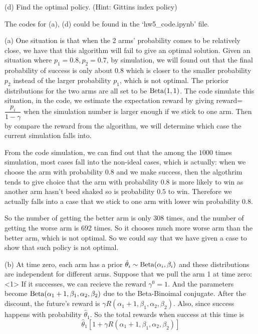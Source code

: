 \begin{homeworkProblem}
(d) Find the optimal policy. (Hint: Gittins index policy)

\solution

The codes for (a), (d) could be found in the `hw5\_code.ipynb' file.

(a) One situation is that when the 2 arms' probability comes to be relatively close, we have that this algorithm will fail to give an optimal solution. Given an situation where $p_1=0.8, p_2=0.7$, by simulation, we will found out that the final probability of success is only about $0.8$ which is closer to the smaller probability $p_2$ instead of the larger probability $p_1$, which is not optimal. The priorior distributions for the two arms are all set to be $\operatorname{Beta}(1,1)$. The code simulate this situation, in the code, we estimate the expectation reward by giving reward=$\dfrac{p_i}{1 - \gamma}$ when the simulation number is larger enough if we stick to one arm. Then by compare the reward from the algorithm, we will determine which case the current simulation falls into.

From the code simulation, we can find out that the among the $1000$ times simulation, most cases fall into the non-ideal cases, which is actually: when we choose the arm with probability $0.8$ and we make success, then the algothrim tends to give choice that the arm with probability $0.8$ is more likely to win as another arm hasn't beed shaked so is probability $0.5$ to win. Therefore we actually falls into a case that we stick to one arm with lower win probability $0.8$.

So the number of getting the better arm is only 308 times, and the number of getting the worse arm is 692 times. So it chooses much more worse arm than the better arm, which is not optimal. So we could say that we have given a case to show that such policy is not optimal.

(b) At time zero, each arm has a prior $\hat{\theta}_i\sim\operatorname{Beta}(\alpha_{i}, \beta_{i})$ and these distributions are independent for different arms. Suppose that we pull the arm 1 at time zero: \\
<1> If it successes, we can recieve the reward $\gamma^0=1$. And the parameters become $\operatorname{Beta}(\alpha_1+1,\beta_1,\alpha_2,\beta_2)$ due to the Beta-Binoimal conjugate. After the discount, the future's reward is $\gamma R(\alpha_1+1,\beta_1,\alpha_2,\beta_2)$. Also, since success happens with probability $\hat{\theta}_1$. So the total rewards when success at this time is
$$\hat{\theta}_1[1+\gamma R(\alpha_1+1,\beta_1,\alpha_2,\beta_2)]$$


\end{homeworkProblem}
